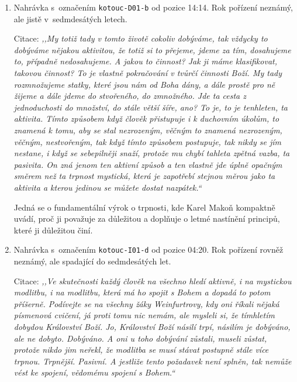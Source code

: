 \begin{enumerate}
  \item{
    Nahrávka s~označením \texttt{kotouc-D01-b} od pozice 14:14. Rok pořízení neznámý, ale
    jistě v~sedmdesátých letech.

    Citace: \textit{%
      ,,My totiž tady v tomto životě cokoliv dobýváme, tak vždycky to dobýváme
      nějakou aktivitou, že totiž si to přejeme, jdeme za tím, dosahujeme to,
      případně nedosahujeme. A jakou to činnost? Jak ji máme klasifikovat,
      takovou činnost? To je vlastně pokračování v tvůrčí činnosti Boží. My tady
      rozmnožujeme statky, které jsou nám od Boha dány, a dále prostě pro ně
      žijeme a dále jdeme do stvořeného, do zmnožného. Jde ta cesta z
      jednoduchosti do množství, do stále větší šíře, ano? To je, to je
      tenhleten, ta aktivita. Tímto způsobem když člověk přistupuje i k
      duchovním úkolům, to znamená k tomu, aby se stal nezrozeným, věčným to
      znamená nezrozeným, věčným, nestvořeným, tak když tímto způsobem
      postupuje, tak nikdy se jím nestane, i když se sebepilněji snaží, protože
      mu chybí tahleta zpětná vazba, ta pasivita. On zná jenom ten aktivní
      způsob a ten vlastně jde úplně opačným směrem než ta trpnost mystická,
      která je zapotřebí stejnou měrou jako ta aktivita a kterou jedinou se
      můžete dostat nazpátek.``
    }

    Jedná se o fundamentální výrok o trpnosti, kde Karel Makoň kompaktně uvádí,
    proč ji považuje za důležitou a doplňuje o letmé nastínění principů, které
    ji důležitou činí.
  }
  \item{
    Nahrávka s~označením \texttt{kotouc-I01-d} od pozice 04:20. Rok pořízení rovněž neznámý, ale
    spadající do sedmdesátých let.

    Citace: \textit{%
      ,,Ve skutečnosti každý člověk na všechno hledí aktivně, i na mystickou
      modlitbu, i na modlitbu, která má ho spojit s Bohem a dopadá to potom
      příšerně. Podívejte se na všechny žáky Weinfurtrovy, kdy oni říkali
      nějaká písmenová cvičení, já proti tomu nic nemám, ale mysleli si, že
      tímhletím dobydou Království Boží. Jo, Království Boží násilí trpí,
      násilím je dobýváno, ale ne dobyto. Dobýváno. A oni u toho dobývání
      zůstali, museli zůstat, protože nikdo jim neřekl, že modlitba se musí
      stávat postupně stále více trpnou. Trpnější. Pasivní. A jestliže tento
      požadavek není splněn, tak nemůže vést ke spojení, vědomému spojení s
      Bohem.``
    }

}
\end{enumerate}
